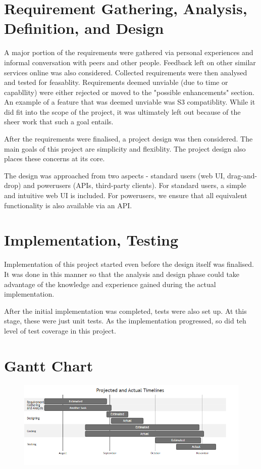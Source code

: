 \documentclass[12pt,a4paper]{report}
\begin{document}
\section{Requirement Gathering, Analysis, Definition, and Design}\label{sec:req}
A major portion of the requirements were gathered via personal experiences and informal conversation with peers and other people.
Feedback left on other similar services online was also considered.
Collected requirements were then analysed and tested for feasablity.
Requirements deemed unviable (due to time or capabllity) were either rejected or moved to the "possible enhancements" section.
An example of a feature that was deemed unviable was S3 compatiblity.
While it did fit into the scope of the project, it was ultimately left out because of the sheer work that such a goal entails.

After the requirements were finalised, a project design was then considered.
The main goals of this project are simplicity and flexiblity.
The project design also places these concerns at its core.

The design was approached from two aspects - standard users (web UI, drag-and-drop) and powerusers (APIs, third-party clients).
For standard users, a simple and intuitive web UI is included.
For powerusers, we ensure that all equivalent functionality is also available via an API.

\section{Implementation, Testing}\label{sec:impl}
Implementation of this project started even before the design itself was finalised.
It was done in this manner so that the analysis and design phase could take advantage of the knowledge and experience gained during the actual implementation.

After the initial implementation was completed, tests were also set up.
At this stage, these were just unit tests.
As the implementation progressed, so did teh level of test coverage in this project.

\section{Gantt Chart}\label{sec:gantt}
\begin{figure}[H]
	\includegraphics[width=\textwidth]{gantt.png}
\end{figure}
\end{document}
